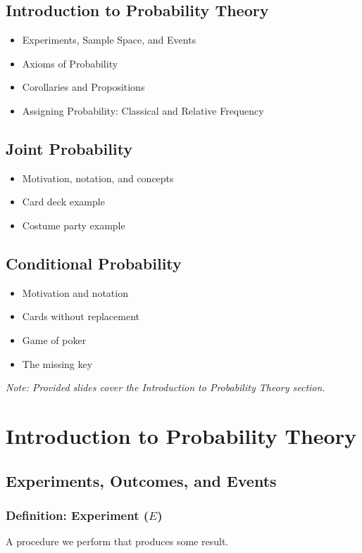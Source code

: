 \documentclass[12pt]{article}
\begin{document}
\subsection*{Introduction to Probability Theory}
\begin{itemize}
\item Experiments, Sample Space, and Events
\item Axioms of Probability
\item Corollaries and Propositions
\item Assigning Probability: Classical and Relative Frequency
\end{itemize}

\subsection*{Joint Probability}
\begin{itemize}
\item Motivation, notation, and concepts
\item Card deck example
\item Costume party example
\end{itemize}

\subsection*{Conditional Probability}
\begin{itemize}
\item Motivation and notation
\item Cards without replacement
\item Game of poker
\item The missing key
\end{itemize}

\textit{Note: Provided slides cover the Introduction to Probability Theory section.}


\section{Introduction to Probability Theory}

\subsection{Experiments, Outcomes, and Events}

\subsubsection*{Definition: Experiment ($E$)}
A procedure we perform that produces some result.
\end{document}
